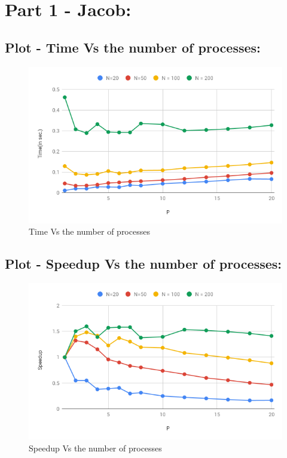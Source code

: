 \documentclass[a4 paper]{article}
\begin{document}

\section*{Part 1 - Jacob:}
\subsection*{Plot - Time Vs the number of processes:}

\begin{figure}[H]
	\centering %
	\includegraphics[width=160mm]{Jacob_time_P.png}
	\caption{Time Vs the number of processes\label{MIMD}}
\end{figure}

\subsection*{Plot - Speedup Vs the number of processes:}

\begin{figure}[H]
	\centering %
	\includegraphics[width=160mm]{Jacob_speedup_P.png}
	\caption{Speedup Vs the number of processes\label{MIMD}}
\end{figure}
\end{document}

